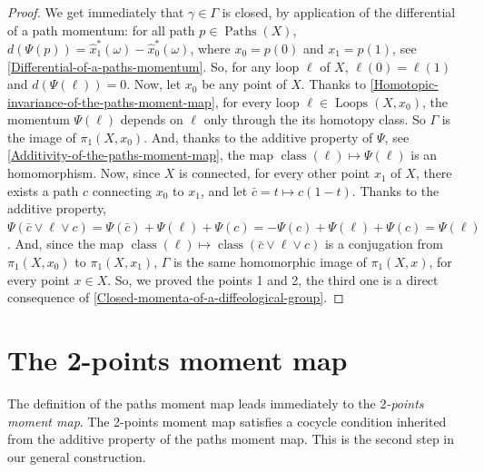\documentclass[10pt,reqno,twoside]{amsart}
\DeclareMathOperator{\Paths}{Paths}
\DeclareMathOperator{\Loops}{Loops}
\DeclareMathOperator{\class}{class}
\theoremstyle{plain}
\theoremstyle{definition}
\begin{document}
  \begin{proof}
    We get immediately that $\gamma \in \Gamma$ is closed,
    by application of the differential of a path momentum:
    for all path $p \in \Paths(X)$,
    $d(\Psi(p)) = \hat x_1^*(\omega) -\hat x_0^*(\omega)$,
    where $x_0=p(0)$ and $x_1=p(1)$,
    see \ref{Differential-of-a-paths-momentum}.
    So,
    for any loop $\ell$ of $X$,
    $\ell(0) = \ell(1)$ and $d(\Psi(\ell)) = 0$.
    Now,
    let $x_0$ be any point of $X$.
    Thanks to \ref{Homotopic-invariance-of-the-paths-moment-map},
    for every loop $\ell \in \Loops(X,x_0)$,
    the momentum $\Psi(\ell)$ depends on $\ell$ only through the its homotopy class.
    So $\Gamma$ is the image of $\pi_1(X,x_0)$.
    And,
    thanks to the additive property of $\Psi$,
    see \ref{Additivity-of-the-paths-moment-map},
    the map $\class(\ell) \mapsto \Psi(\ell)$ is an homomorphism.
    Now,
    since $X$ is connected,
    for every other point $x_1$ of $X$,
    there exists a path $c$ connecting $x_0$ to $x_1$,
    and let $\bar c = t \mapsto c(1-t)$.
    Thanks to the additive property,
    $\Psi(\bar c \vee \ell \vee c) = \Psi(\bar c) + \Psi(\ell) + \Psi(c) = - \Psi(c) + \Psi(\ell) + \Psi(c) = \Psi(\ell)$.
    And,
    since the map $\class(\ell) \mapsto \class(\bar c \vee \ell \vee c)$ is a conjugation from $\pi_1(X,x_0)$ to $\pi_1(X,x_1)$,
    $\Gamma$ is the same homomorphic image of $\pi_1(X,x)$,
    for every point $x \in X$.
    So,
    we proved the points 1 and 2,
    the third one is a direct consequence of \ref{Closed-momenta-of-a-diffeological-group}.
  \end{proof}
  
  \section{The 2-points moment map}
  
  The definition of the paths moment map leads immediately to the {\em $2$-points moment map}.
  The 2-points moment map satisfies a cocycle condition inherited from the additive property of the paths moment map.
  This is the second step in our general construction.
  
\end{document}
